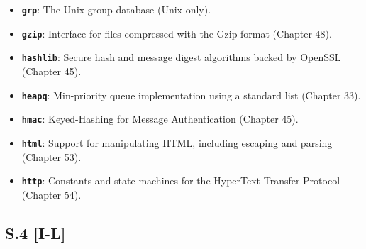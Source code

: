 \begin{itemize}
  \textbf{\passthrough{\lstinline!graphlib!}}: Support for topological
  sorting of graphs (Chapter 47).
\item
  \textbf{\passthrough{\lstinline!grp!}}: The Unix group database (Unix
  only).
\item
  \textbf{\passthrough{\lstinline!gzip!}}: Interface for files
  compressed with the Gzip format (Chapter 48).
\item
  \textbf{\passthrough{\lstinline!hashlib!}}: Secure hash and message
  digest algorithms backed by OpenSSL (Chapter 45).
\item
  \textbf{\passthrough{\lstinline!heapq!}}: Min-priority queue
  implementation using a standard list (Chapter 33).
\item
  \textbf{\passthrough{\lstinline!hmac!}}: Keyed-Hashing for Message
  Authentication (Chapter 45).
\item
  \textbf{\passthrough{\lstinline!html!}}: Support for manipulating
  HTML, including escaping and parsing (Chapter 53).
\item
  \textbf{\passthrough{\lstinline!http!}}: Constants and state machines
  for the HyperText Transfer Protocol (Chapter 54).
\end{itemize}

\hypertarget{s.4-i-l}{%
\subsection{S.4 {[}I-L{]}}\label{s.4-i-l}}

